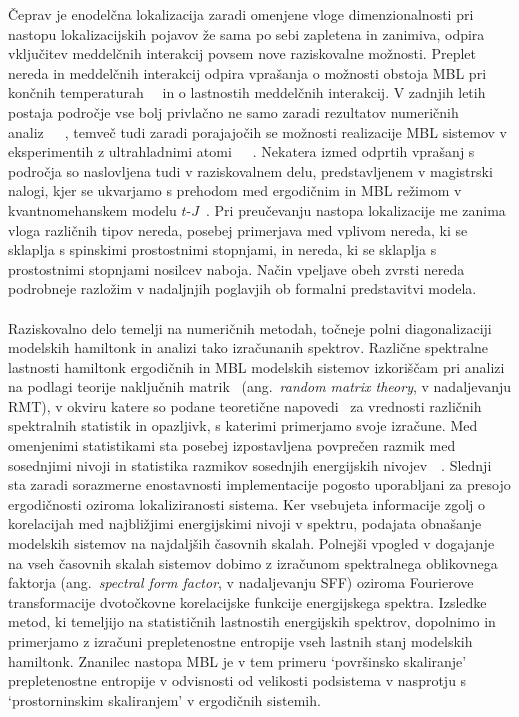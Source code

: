  Čeprav je enodelčna lokalizacija zaradi omenjene  vloge dimenzionalnosti pri nastopu lokalizacijskih pojavov že sama po sebi zapletena in zanimiva, odpira vključitev meddelčnih interakcij povsem nove raziskovalne možnosti. Preplet nereda in meddelčnih interakcij odpira vprašanja o možnosti obstoja MBL pri končnih temperaturah~\cite{basko2006metal}~\cite{PhysRevB.75.155111} in o lastnostih meddelčnih interakcij. V zadnjih letih postaja področje vse bolj privlačno ne samo zaradi rezultatov numeričnih analiz~\cite{vznidarivc2008many}~\cite{PhysRevB.75.155111}~\cite{PhysRevA.92.041601}, temveč tudi zaradi porajajočih se možnosti realizacije MBL sistemov v eksperimentih z ultrahladnimi atomi~\cite{PhysRevLett.114.083002}~\cite{schreiber2015observation}~\cite{PhysRevLett.116.140401}. Nekatera izmed odprtih vprašanj s področja so naslovljena tudi v raziskovalnem delu, predstavljenem v magistrski nalogi, kjer se ukvarjamo s prehodom med ergodičnim in MBL režimom v kvantnomehanskem modelu $t$-$J$~\cite{spalek2007tj}. Pri preučevanju nastopa lokalizacije me zanima vloga različnih tipov nereda, posebej primerjava med vplivom nereda, ki se sklaplja s spinskimi prostostnimi stopnjami, in nereda, ki se sklaplja s prostostnimi stopnjami nosilcev naboja. Način vpeljave obeh zvrsti nereda podrobneje razložim v nadaljnjih poglavjih ob formalni predstavitvi modela.
  \\\\Raziskovalno delo temelji na numeričnih metodah, točneje polni diagonalizaciji modelskih hamiltonk in 
  analizi tako izračunanih spektrov.  Različne spektralne lastnosti hamiltonk ergodičnih in MBL modelskih sistemov izkoriščam pri analizi na podlagi teorije naključnih matrik~\cite{d2016quantum} (ang.~\emph{random matrix theory}, v nadaljevanju RMT), v okviru katere so podane teoretične napovedi~\cite{mehta2004random} za vrednosti različnih spektralnih statistik in opazljivk, s katerimi primerjamo svoje izračune. Med omenjenimi statistikami sta posebej izpostavljena povprečen razmik med sosednjimi nivoji in statistika razmikov sosednjih energijskih nivojev~\cite{Atas_Distribution_PhysRevLett.110.084101}~\cite{PhysRevB.75.155111}. Slednji sta zaradi sorazmerne enostavnosti implementacije pogosto uporabljani za presojo ergodičnosti oziroma lokaliziranosti sistema. Ker vsebujeta informacije zgolj o korelacijah med najbližjimi energijskimi nivoji v spektru, podajata obnašanje modelskih sistemov na najdaljših časovnih skalah. Polnejši vpogled v dogajanje na vseh časovnih skalah sistemov dobimo z izračunom spektralnega oblikovnega faktorja (ang.~\emph{spectral form factor}, v nadaljevanju SFF) oziroma Fourierove transformacije dvotočkovne korelacijske funkcije energijskega spektra. Izsledke metod, ki temeljijo na statističnih lastnostih energijskih spektrov, dopolnimo in primerjamo z izračuni prepletenostne entropije vseh lastnih stanj modelskih hamiltonk. Znanilec nastopa MBL je v tem primeru `površinsko skaliranje' prepletenostne entropije v odvisnosti od velikosti podsistema v nasprotju s `prostorninskim skaliranjem' v ergodičnih sistemih. \\\\
